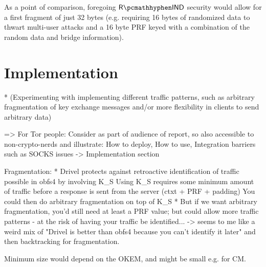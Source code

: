 As a point of comparison, foregoing $\rind$ security would allow for a first fragment of just 32 bytes (e.g. requiring 16 bytes of randomized data to thwart multi-user attacks and a 16 byte PRF keyed with a combination of the random data and bridge information).

\newpage 

\section{Implementation} \label{sec:implementation}

* (Experimenting with implementing different traffic patterns, such as arbitrary fragmentation of key
exchange messages and/or more flexibility in clients to send arbitrary data)


=> For Tor people: Consider as part of audience of report, so also accessible to non-crypto-nerds and illustrate: How to deploy, How to use, Integration barriers such as SOCKS issues -> Implementation section


Fragmentation:
* Drivel protects against retroactive identification of traffic possible in obfs4 by involving K_S
    Using K_S requires some minimum amount of traffic before a response is sent from the server (ctxt + PRF + padding)
    You could then do arbitrary fragmentation on top of K_S
* But if we want arbitrary fragmentation, you'd still need at least a PRF value; but could allow more traffic patterns - at the risk of having your traffic be identified...
-> seems to me like a weird mix of "Drivel is better than obfs4 because you can't identify it later" and then backtracking for fragmentation.

Minimum size would depend on the OKEM, and might be small e.g. for CM.
